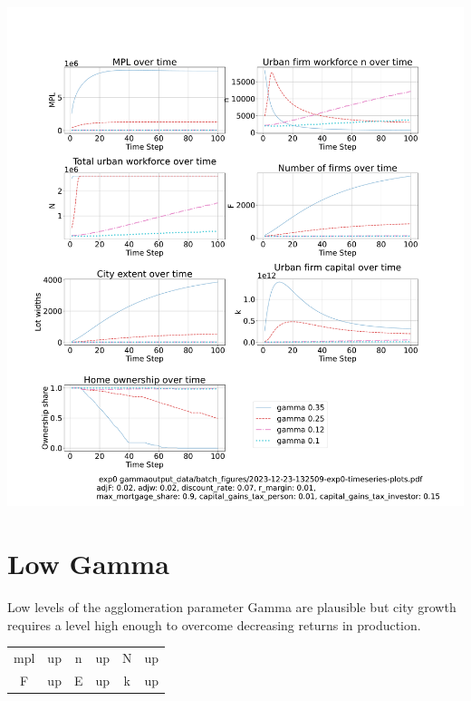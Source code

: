 \documentclass{article}
\begin{document}
 \hspace*{-2.5cm}\includegraphics[trim= 1.5cm 3.65cm 2cm 4.0cm, clip, scale=.28]{fig/Analysis/Gamma-5-30.pdf}

\newpage %
\section{Low Gamma}
Low levels of the agglomeration parameter Gamma are plausible but city growth requires a level high enough to overcome decreasing returns in production.
 
\begin{tabular}{|c|c||c|c||c|c|}
mpl  & up   & n   & up & N   &  up \\
F    & up   & E   &  up  &  k & up
\end{tabular} 
\end{document}
